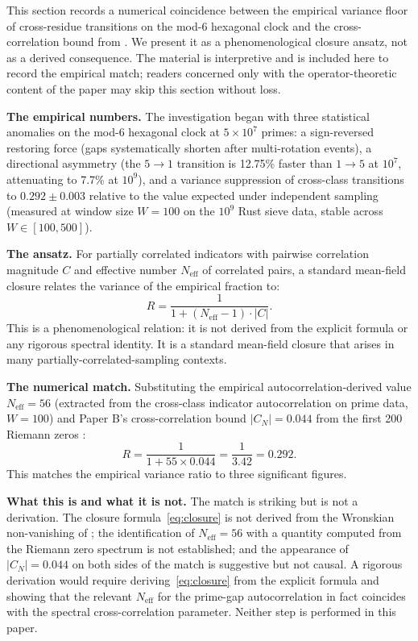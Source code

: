 \documentclass[11pt,a4paper]{article}
\begin{document}
This section records a numerical coincidence between the empirical variance floor of cross-residue transitions on the mod-6 hexagonal clock and the cross-correlation bound from \cite{WallaceB}. We present it as a phenomenological closure ansatz, not as a derived consequence. The material is interpretive and is included here to record the empirical match; readers concerned only with the operator-theoretic content of the paper may skip this section without loss.

\textbf{The empirical numbers.} The investigation began with three statistical anomalies on the mod-6 hexagonal clock at $5 \times 10^7$ primes: a sign-reversed restoring force (gaps systematically shorten after multi-rotation events), a directional asymmetry (the $5 \to 1$ transition is 12.75\% faster than $1 \to 5$ at $10^7$, attenuating to 7.7\% at $10^9$), and a variance suppression of cross-class transitions to $0.292 \pm 0.003$ relative to the value expected under independent sampling (measured at window size $W = 100$ on the $10^9$ Rust sieve data, stable across $W \in [100, 500]$).

\textbf{The ansatz.} For partially correlated indicators with pairwise correlation magnitude $C$ and effective number $N_{\text{eff}}$ of correlated pairs, a standard mean-field closure relates the variance of the empirical fraction to:
\begin{equation}
R = \frac{1}{1 + (N_{\text{eff}} - 1) \cdot |C|}.
\label{eq:closure}
\end{equation}
This is a phenomenological relation: it is not derived from the explicit formula or any rigorous spectral identity. It is a standard mean-field closure that arises in many partially-correlated-sampling contexts.

\textbf{The numerical match.} Substituting the empirical autocorrelation-derived value $N_{\text{eff}} = 56$ (extracted from the cross-class indicator autocorrelation on prime data, $W = 100$) and Paper B's cross-correlation bound $|C_N| = 0.044$ from the first 200 Riemann zeros \cite{WallaceB}:
\begin{equation}
R = \frac{1}{1 + 55 \times 0.044} = \frac{1}{3.42} = 0.292.
\end{equation}
This matches the empirical variance ratio to three significant figures.

\textbf{What this is and what it is not.} The match is striking but is not a derivation. The closure formula~\eqref{eq:closure} is not derived from the Wronskian non-vanishing of \cite{WallaceB}; the identification of $N_{\text{eff}} = 56$ with a quantity computed from the Riemann zero spectrum is not established; and the appearance of $|C_N| = 0.044$ on both sides of the match is suggestive but not causal. A rigorous derivation would require deriving~\eqref{eq:closure} from the explicit formula and showing that the relevant $N_{\text{eff}}$ for the prime-gap autocorrelation in fact coincides with the spectral cross-correlation parameter. Neither step is performed in this paper.
\end{document}
